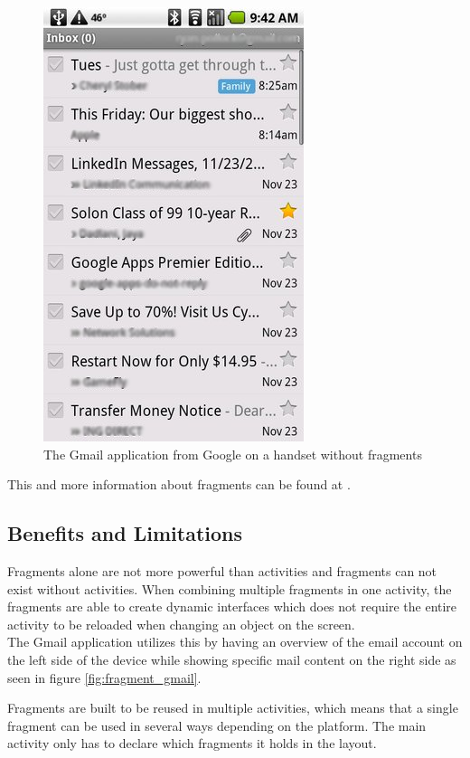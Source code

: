\begin{figure}[H]
	\centering
		\includegraphics[scale=0.4]{Images/Implementation/fragment_gmail_handset.png}
	\caption{The Gmail application from Google on a handset without fragments}
	\label{fig:fragment_gmail_handset}
\end{figure}


This and more information about fragments can be found at \cite{web:android:fragments}.

\subsection{Benefits and Limitations}
Fragments alone are not more powerful than activities and fragments can not exist without activities.
When combining multiple fragments in one activity, the fragments are able to create dynamic interfaces which does not require the entire activity to be reloaded when changing an object on the screen.\\

The Gmail application utilizes this by having an overview of the email account on the left side of the device while showing specific mail content on the right side as seen in figure \ref{fig:fragment_gmail}.

Fragments are built to be reused in multiple activities, which means that a single fragment can be used in several ways depending on the platform.
The main activity only has to declare which fragments it holds in the layout.

